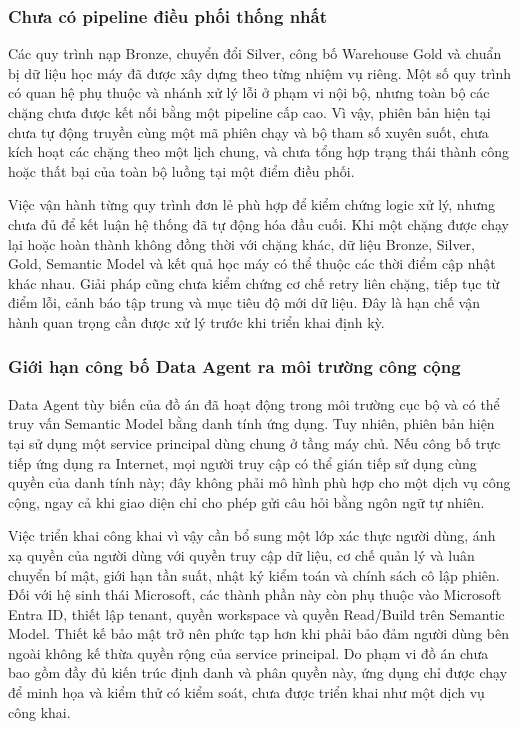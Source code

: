 \subsubsection{Chưa có pipeline điều phối thống nhất}

Các quy trình nạp Bronze, chuyển đổi Silver, công bố Warehouse Gold và chuẩn bị dữ liệu học máy đã được xây dựng theo từng nhiệm vụ riêng. Một số quy trình có quan hệ phụ thuộc và nhánh xử lý lỗi ở phạm vi nội bộ, nhưng toàn bộ các chặng chưa được kết nối bằng một pipeline cấp cao. Vì vậy, phiên bản hiện tại chưa tự động truyền cùng một mã phiên chạy và bộ tham số xuyên suốt, chưa kích hoạt các chặng theo một lịch chung, và chưa tổng hợp trạng thái thành công hoặc thất bại của toàn bộ luồng tại một điểm điều phối.

Việc vận hành từng quy trình đơn lẻ phù hợp để kiểm chứng logic xử lý, nhưng chưa đủ để kết luận hệ thống đã tự động hóa đầu cuối. Khi một chặng được chạy lại hoặc hoàn thành không đồng thời với chặng khác, dữ liệu Bronze, Silver, Gold, Semantic Model và kết quả học máy có thể thuộc các thời điểm cập nhật khác nhau. Giải pháp cũng chưa kiểm chứng cơ chế retry liên chặng, tiếp tục từ điểm lỗi, cảnh báo tập trung và mục tiêu độ mới dữ liệu. Đây là hạn chế vận hành quan trọng cần được xử lý trước khi triển khai định kỳ.

\subsubsection{Giới hạn công bố Data Agent ra môi trường công cộng}

Data Agent tùy biến của đồ án đã hoạt động trong môi trường cục bộ và có thể truy vấn Semantic Model bằng danh tính ứng dụng. Tuy nhiên, phiên bản hiện tại sử dụng một service principal dùng chung ở tầng máy chủ. Nếu công bố trực tiếp ứng dụng ra Internet, mọi người truy cập có thể gián tiếp sử dụng cùng quyền của danh tính này; đây không phải mô hình phù hợp cho một dịch vụ công cộng, ngay cả khi giao diện chỉ cho phép gửi câu hỏi bằng ngôn ngữ tự nhiên.

Việc triển khai công khai vì vậy cần bổ sung một lớp xác thực người dùng, ánh xạ quyền của người dùng với quyền truy cập dữ liệu, cơ chế quản lý và luân chuyển bí mật, giới hạn tần suất, nhật ký kiểm toán và chính sách cô lập phiên. Đối với hệ sinh thái Microsoft, các thành phần này còn phụ thuộc vào Microsoft Entra ID, thiết lập tenant, quyền workspace và quyền Read/Build trên Semantic Model. Thiết kế bảo mật trở nên phức tạp hơn khi phải bảo đảm người dùng bên ngoài không kế thừa quyền rộng của service principal. Do phạm vi đồ án chưa bao gồm đầy đủ kiến trúc định danh và phân quyền này, ứng dụng chỉ được chạy để minh họa và kiểm thử có kiểm soát, chưa được triển khai như một dịch vụ công khai.

